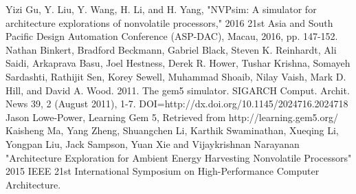 \documentclass[conference]{IEEEtran}
\begin{document}
\begin{thebibliography}{00}
Yizi Gu, Y. Liu, Y. Wang, H. Li, and H. Yang, "NVPsim: A simulator for architecture explorations of nonvolatile processors," 2016 21st Asia and South Pacific Design Automation Conference (ASP-DAC), Macau, 2016, pp. 147-152.
Nathan Binkert, Bradford Beckmann, Gabriel Black, Steven K. Reinhardt, Ali Saidi, Arkaprava Basu, Joel Hestness, Derek R. Hower, Tushar Krishna, Somayeh Sardashti, Rathijit Sen, Korey Sewell, Muhammad Shoaib, Nilay Vaish, Mark D. Hill, and David A. Wood. 2011. The gem5 simulator. SIGARCH Comput. Archit. News 39, 2 (August 2011), 1-7. DOI=http://dx.doi.org/10.1145/2024716.2024718
 Jason Lowe-Power, Learning Gem 5, Retrieved from http://learning.gem5.org/
Kaisheng Ma, Yang Zheng, Shuangchen Li, Karthik Swaminathan, Xueqing Li,
Yongpan Liu, Jack Sampson, Yuan Xie and Vijaykrishnan Narayanan "Architecture Exploration for Ambient Energy
Harvesting Nonvolatile Processors" 2015 IEEE 21st International Symposium on High-Performance Computer Architecture.
\end{thebibliography}
\vspace{12pt}
\end{document}
